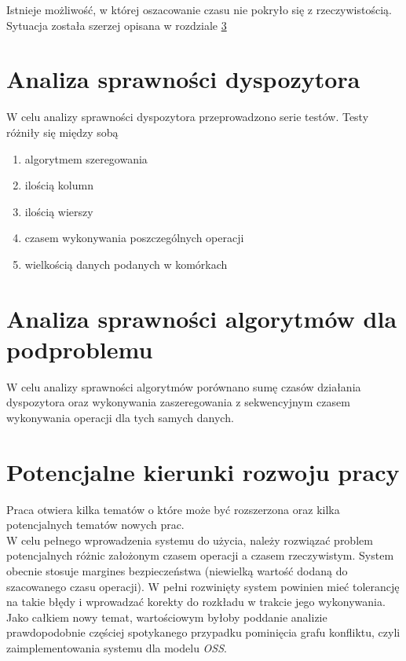 \documentclass[brudnopis]{xmgr}
\begin{document}
Istnieje możliwość, w której oszacowanie czasu nie pokryło się z rzeczywistością. Sytuacja została szerzej opisana w rozdziale \ref{chap:extend}

\chapter{Analiza sprawności dyspozytora}

W celu analizy sprawności dyspozytora przeprowadzono serie testów.
Testy różniły się między sobą
\begin{enumerate}
    \item algorytmem szeregowania
    \item ilością kolumn
    \item ilością wierszy
    \item czasem wykonywania poszczególnych operacji
    \item wielkością danych podanych w komórkach
\end{enumerate}

\chapter{Analiza sprawności algorytmów dla podproblemu}

W celu analizy sprawności algorytmów porównano sumę czasów działania dyspozytora oraz wykonywania zaszeregowania z sekwencyjnym czasem wykonywania operacji dla tych samych danych.

\chapter{Potencjalne kierunki rozwoju pracy} \label{chap:extend}

Praca otwiera kilka tematów o które może być rozszerzona oraz kilka potencjalnych tematów nowych prac.
\medskip\\

W celu pełnego wprowadzenia systemu do użycia, należy rozwiązać problem potencjalnych różnic założonym czasem operacji a czasem rzeczywistym. System obecnie stosuje margines bezpieczeństwa (niewielką wartość dodaną do szacowanego czasu operacji).
W pełni rozwinięty system powinien mieć tolerancję na takie błędy i wprowadzać korekty do rozkładu w trakcie jego wykonywania.
\medskip\\

Jako całkiem nowy temat, wartościowym byłoby poddanie analizie prawdopodobnie częściej spotykanego przypadku pominięcia grafu konfliktu, czyli zaimplementowania systemu dla modelu \emph{OSS}.
\medskip\\
\end{document}
